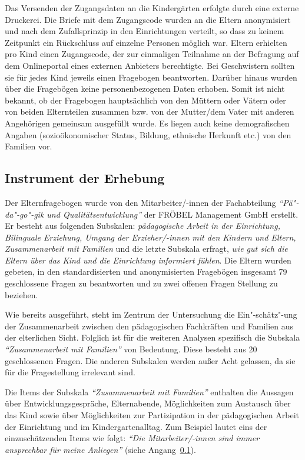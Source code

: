 \documentclass[12pt,a4paper]{article}
\begin{document}
	Das Versenden der Zugangsdaten an die Kindergärten erfolgte durch eine externe Druckerei. Die Briefe mit dem Zugangscode wurden an die Eltern anonymisiert und nach dem Zufallsprinzip in den Einrichtungen verteilt, so dass zu keinem Zeitpunkt ein Rückschluss auf einzelne Personen möglich war. Eltern erhielten pro Kind einen Zugangscode, der zur einmaligen Teilnahme an der Befragung auf dem Onlineportal eines externen Anbieters berechtigte. Bei Geschwistern sollten sie für jedes Kind jeweils einen Fragebogen beantworten. Darüber hinaus wurden über die Fragebögen keine personenbezogenen Daten erhoben. Somit ist nicht bekannt, ob der Fragebogen hauptsächlich von den Müttern oder Vätern oder von beiden Elternteilen zusammen bzw. von der Mutter/dem Vater mit anderen Angehörigen gemeinsam ausgefüllt wurde. Es liegen auch keine demografischen Angaben (sozioökonomischer Status, Bildung, ethnische Herkunft etc.) von den Familien vor.

\subsection{Instrument der Erhebung} 
Der Elternfragebogen wurde von den Mitarbeiter/-innen der Fachabteilung \textit{"`Pä"-da"-go"-gik und Qualitätsentwicklung"'} der FRÖBEL Management GmbH erstellt. Er besteht aus folgenden Subskalen: \textit{pädagogische Arbeit in der Einrichtung, Bilinguale Erziehung, Umgang der Erzieher/-innen mit den Kindern und Eltern, Zusammenarbeit mit Familien} und die letzte Subskala erfragt, \textit{wie gut sich die Eltern über das Kind und die Einrichtung informiert fühlen}. Die Eltern wurden gebeten, in den standardisierten und anonymisierten Fragebögen insgesamt 79 geschlossene Fragen zu beantworten und zu zwei offenen Fragen Stellung zu beziehen.

	Wie bereits ausgeführt, steht im Zentrum der Untersuchung die Ein"-schätz"-ung der Zusammenarbeit zwischen den pädagogischen Fachkräften und Familien aus der elterlichen Sicht. Folglich ist für die weiteren Analysen spezifisch die Subskala \textit{"`Zusammenarbeit mit Familien"'} von Bedeutung. Diese besteht aus 20 geschlossenen Fragen. Die anderen Subskalen werden außer Acht gelassen, da sie für die Fragestellung irrelevant sind.
	
	Die Items der Subskala \textit{"`Zusammenarbeit mit Familien"'} enthalten die Aussagen über Entwicklungsgespräche, Elternabende, Möglichkeiten zum Austausch über das Kind sowie über Möglichkeiten zur Partizipation in der pädagogischen Arbeit der Einrichtung und im Kindergartenalltag. Zum Beispiel lautet eins der einzuschätzenden Items wie folgt: \textit{"`Die Mitarbeiter/-innen sind immer ansprechbar für meine Anliegen"'} (siehe Angang~\ref{}). %
	
\end{document}
